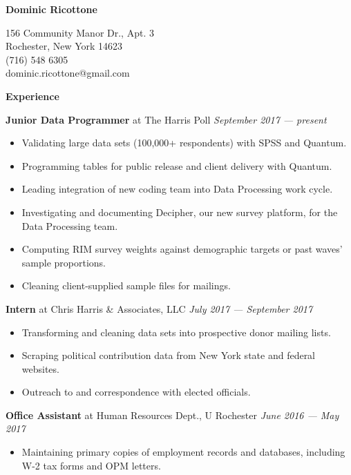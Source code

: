 \documentclass[12pt]{article}
\newenvironment{details}{
\begin{itemize}[label={}]
  \small \setlength{\itemsep}{0pt}
}{\end{itemize}}
\begin{document}
\centering \Huge
\textbf{Dominic Ricottone}

\footnotesize
\begin{multicols}{2}
156 Community Manor Dr., Apt. 3 \\
Rochester, New York 14623 \\
(716) 548 6305 \\
dominic.ricottone@gmail.com
\end{multicols}

\large
\textbf{Experience} \hrulefill

\vspace{.1in}
\normalsize
\textbf{Junior Data Programmer} at The Harris Poll \hfill \textit{September 2017 --- present}
\begin{details}
  \item Validating large data sets (100,000+ respondents) with SPSS and Quantum.
  \item Programming tables for public release and client delivery with Quantum.
  \item Leading integration of new coding team into Data Processing work cycle.
  \item Investigating and documenting Decipher, our new survey platform, for the Data Processing team.
  \item Computing RIM survey weights against demographic targets or past waves' sample proportions.
  \item Cleaning client-supplied sample files for mailings.
\end{details}

\vspace{.1in}
\normalsize
\textbf{Intern} at Chris Harris \& Associates, LLC \hfill \textit{July 2017 --- September 2017}
\begin{details}
	\item Transforming and cleaning data sets into prospective donor mailing lists.
	\item Scraping political contribution data from New York state and federal websites.
	\item Outreach to and correspondence with elected officials.
\end{details}

\vspace{.1in}
\normalsize
\textbf{Office Assistant} at Human Resources Dept., U Rochester  \hfill \textit{June 2016 --- May 2017}
\begin{details}
  \item Maintaining primary copies of employment records and databases, including W-2 tax forms and OPM letters.
\end{details}
\end{document}
